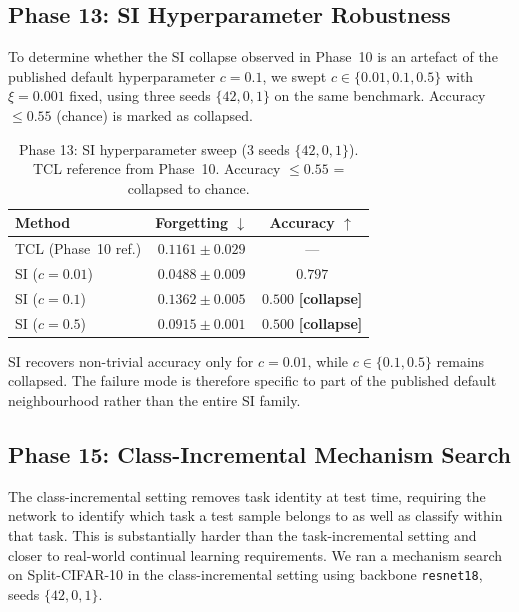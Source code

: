 \subsection{Phase 13: SI Hyperparameter Robustness}
\label{sec:si-robustness}

To determine whether the SI collapse observed in Phase~10 is an artefact of the published
default hyperparameter $c = 0.1$, we swept $c \in \{0.01, 0.1, 0.5\}$
with $\xi = 0.001$ fixed, using three seeds $\{42, 0, 1\}$ on the same benchmark.
Accuracy $\leq 0.55$ (chance) is marked as collapsed.

\begin{table}[h]
\centering
\caption{Phase 13: SI hyperparameter sweep (3 seeds $\{42, 0, 1\}$). TCL reference from Phase~10.
Accuracy $\leq 0.55$ = collapsed to chance.}
\label{tab:si-sweep}
\begin{tabular}{lcc}
\toprule
Method & Forgetting $\downarrow$ & Accuracy $\uparrow$ \\
\midrule
TCL (Phase~10 ref.) & $0.1161 \pm 0.029$ & --- \\
SI ($c=0.01$) & $0.0488 \pm 0.009$ & $0.797$  \\
SI ($c=0.1$) & $0.1362 \pm 0.005$ & $0.500$ \textbf{[collapse]} \\
SI ($c=0.5$) & $0.0915 \pm 0.001$ & $0.500$ \textbf{[collapse]} \\
\bottomrule
\end{tabular}
\end{table}

SI recovers non-trivial accuracy only for $c=0.01$, while $c \in \{0.1, 0.5\}$
remains collapsed. The failure mode is therefore specific to part of the
published default neighbourhood rather than the entire SI family.

\subsection{Phase 15: Class-Incremental Mechanism Search}
\label{sec:class-incremental}

The class-incremental setting removes task identity at test time, requiring the network
to identify which task a test sample belongs to as well as classify within that task.
This is substantially harder than the task-incremental setting and closer to real-world
continual learning requirements. We ran a mechanism search on Split-CIFAR-10 in the
class-incremental setting using backbone \texttt{resnet18}, seeds $\{42, 0, 1\}$.

